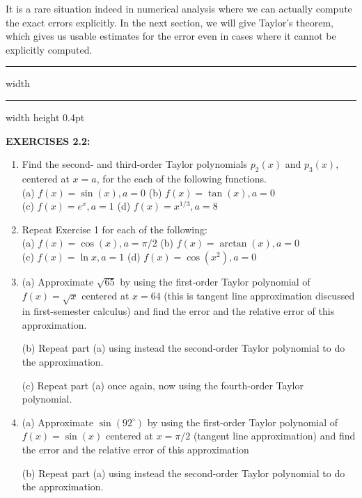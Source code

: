 \documentclass[../main.tex]{subfiles}
\begin{document}
It is a rare situation indeed in numerical analysis where we can actually compute the exact errors explicitly. In the next section, we will give Taylor's theorem, which gives us usable estimates for the error even in cases where it cannot be explicitly computed.\\

\hrule width \hsize \kern 1pt \hrule width \hsize height 0.4pt

\hspace{0.1cm}

\textbf{EXERCISES 2.2: }

\begin{enumerate}
\item Find the second- and third-order Taylor polynomials $p_{2}(x)$ and $p_{3}(x)$, centered at $x=a$, for the each of the following functions.\\
(a) $f(x)=\sin (x), a=0$ \hspace{2.75cm} (b) $f(x)=\tan (x), a=0$\\
(c) $f(x)=e^{x}, a=1$ \hspace{3.50cm}(d) $f(x)=x^{1 / 3}, a=8$

\item Repeat Exercise 1 for each of the following:\\
(a) $f(x)=\cos (x), a=\pi / 2$\hspace{2.50cm} (b) $f(x)=\arctan (x), a=0$\\
(c) $f(x)=\ln x, a=1$ \hspace{3.25cm} (d) $f(x)=\cos \left(x^{2}\right), a=0$

\item (a) Approximate $\sqrt{65}$ by using the first-order Taylor polynomial of $f(x)=\sqrt{x}$ centered at $x=64$ (this is tangent line approximation discussed in first-semester calculus) and find the error and the relative error of this approximation.

(b) Repeat part (a) using instead the second-order Taylor polynomial to do the approximation.

(c) Repeat part (a) once again, now using the fourth-order Taylor polynomial.

\item (a) Approximate $\sin \left(92^{\circ}\right)$ by using the first-order Taylor polynomial of $f(x)=\sin (x)$ centered at $x=\pi / 2$ (tangent line approximation) and find the error and the relative error of this approximation

(b) Repeat part (a) using instead the second-order Taylor polynomial to do the approximation.


\end{enumerate}
\end{document}

